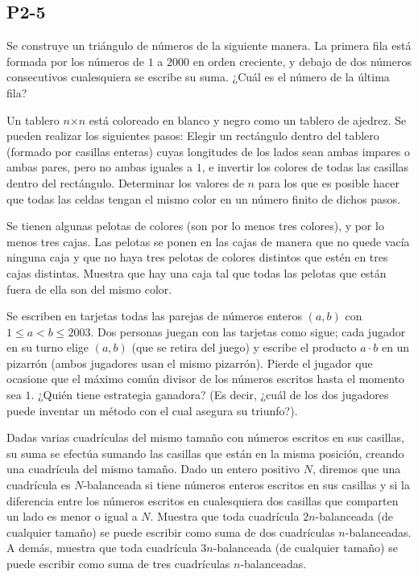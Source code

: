 \documentclass[11pt]{scrartcl}
\begin{document}
\subsection{P2-5}
\begin{problem}
    [2000/2]
    Se construye un triángulo de números de la siguiente manera. La primera fila está formada por los números de $1$ a $2000$ en orden creciente, y debajo de dos números consecutivos cualesquiera se escribe su suma. ¿Cuál es el número de la última fila? 
\end{problem}
\begin{problem}
    [2000/5]
    Un tablero $n$×$n$ está coloreado en blanco y negro como un tablero de ajedrez. Se pueden realizar los siguientes pasos: Elegir un rectángulo dentro del tablero (formado por casillas enteras) cuyas longitudes de los lados sean ambas impares o ambas pares, pero no ambas iguales a $1$, e invertir los colores de todas las casillas dentro del rectángulo. Determinar los valores de $n$ para los que es posible hacer que todas las celdas tengan el mismo color en un número finito de dichos pasos. 
\end{problem}
\begin{problem}
    [2001/2]
    Se tienen algunas pelotas de colores (son por lo menos tres colores), y por lo menos tres cajas. Las pelotas se ponen en las cajas de manera que no quede vacía ninguna caja y que no haya tres pelotas de colores distintos que estén en tres cajas distintas. Muestra que hay una caja tal que todas las pelotas que están fuera de ella son del mismo color.
\end{problem}
\begin{problem}
    [2003/5]
    Se escriben en tarjetas todas las parejas de números enteros $(a,b)$ con $1\leq a < b\leq 2003$. Dos personas juegan con las tarjetas como sigue; cada jugador en su turno elige $(a,b)$ (que se retira del juego) y escribe el producto $a\cdot b$ en un pizarrón (ambos jugadores usan el mismo pizarrón). Pierde el jugador que ocasione que el máximo común divisor de los números escritos hasta el momento sea $1$. ¿Quién tiene estrategia ganadora? (Es decir, ¿cuál de los dos jugadores puede inventar un método con el cual asegura su triunfo?). 
\end{problem}
\begin{problem}
    [2005/2]
    Dadas varias cuadrículas del mismo tamaño con números escritos en sus casillas, su suma se efectúa sumando las casillas que están en la misma posición, creando una cuadrícula del mismo tamaño.
Dado un entero positivo $N$, diremos que una cuadrícula es $N$-balanceada si tiene números enteros escritos en sus casillas y si la diferencia entre los números escritos en cualesquiera dos casillas que comparten un lado es menor o igual a $N$. Muestra que toda cuadrícula $2n$-balanceada (de cualquier tamaño) se puede escribir como suma de dos cuadrículas $n$-balanceadas. A demás, muestra que toda cuadrícula $3n$-balanceada (de cualquier tamaño) se puede escribir como suma de tres cuadrículas $n$-balanceadas.
\end{problem}
\end{document}
